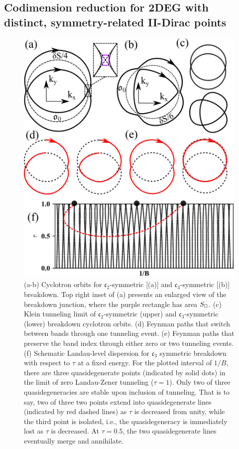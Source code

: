 \documentclass[aps, showpacs, twocolumn, notitlepage, superscriptaddress]{revtex4-1}
\begin{document}
\subsection{Codimension reduction for 2DEG with distinct, symmetry-related II-Dirac points}\label{sec:rotsymmbreakdown}

\begin{figure}
\includegraphics[width=1.0\columnwidth]{Cn-breakdown.png}
\caption{(a-b) Cyclotron orbits for $\mathfrak{c}_2$-symmetric [(a)] and $\mathfrak{c}_3$-symmetric [(b)] breakdown. Top right inset of (a) presents an enlarged view of the breakdown junction, where the purple rectangle has area $S_{\scriptscriptstyle{\square}}$. (c) Klein tunneling limit of $\mathfrak{c}_2$-symmetric (upper) and $\mathfrak{c}_3$-symmetric (lower) breakdown cyclotron orbits. (d) Feynman paths that switch between bands through  one tunneling event. (e) Feynman paths that preserve the band index through either zero or two tunneling events. (f) Schematic Landau-level dispersion for $\mathfrak{c}_3$ symmetric breakdown with respect to $\tau$ at a fixed energy. For the plotted interval of $1/B$, there are three quasidegenerate points (indicated by solid dots) in the  limit of zero Landau-Zener tunneling ($\tau=1$). Only two of three quasidegeneracies are stable upon inclusion of tunneling. That is to say, two of three  two points extend into quasidegenerate lines (indicated by red dashed lines) as $\tau$ is decreased from unity, while the third point is isolated, i.e., the quasidegeneracy is immediately lost as $\tau$ is decreased. At $\tau=0.5$, the two quasidegenerate lines eventually merge and annihilate.\label{fig:Cn-breakdown}}
\end{figure}
\end{document}

